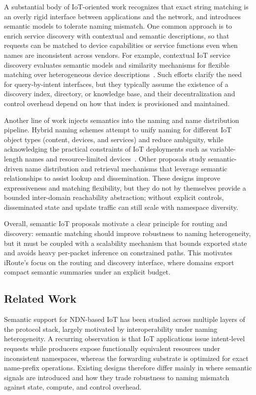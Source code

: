 \documentclass[journal]{IEEEtran}
\begin{document}
A substantial body of IoT-oriented work recognizes that exact string matching is an overly rigid interface between applications and the network, and introduces semantic models to tolerate naming mismatch. One common approach is to enrich service discovery with contextual and semantic descriptions, so that requests can be matched to device capabilities or service functions even when names are inconsistent across vendors. For example, contextual IoT service discovery evaluates semantic models and similarity mechanisms for flexible matching over heterogeneous device descriptions~\cite{antunes2022context}. Such efforts clarify the need for query-by-intent interfaces, but they typically assume the existence of a discovery index, directory, or knowledge base, and their decentralization and control overhead depend on how that index is provisioned and maintained.

Another line of work injects semantics into the naming and name distribution pipeline. Hybrid naming schemes attempt to unify naming for different IoT object types (content, devices, and services) and reduce ambiguity, while acknowledging the practical constraints of IoT deployments such as variable-length names and resource-limited devices~\cite{hybrid_iot_naming}. Other proposals study semantic-driven name distribution and retrieval mechanisms that leverage semantic relationships to assist lookup and dissemination. These designs improve expressiveness and matching flexibility, but they do not by themselves provide a bounded inter-domain reachability abstraction; without explicit controls, disseminated state and update traffic can still scale with namespace diversity.

Overall, semantic IoT proposals motivate a clear principle for routing and discovery: semantic matching should improve robustness to naming heterogeneity, but it must be coupled with a scalability mechanism that bounds exported state and avoids heavy per-packet inference on constrained paths. This motivates iRoute's focus on the routing and discovery interface, where domains export compact semantic summaries under an explicit budget.

\subsection{Related Work}
\label{sec:bg_related}

Semantic support for NDN-based IoT has been studied across multiple layers of the protocol stack, largely motivated by interoperability under naming heterogeneity.
A recurring observation is that IoT applications issue intent-level requests while producers expose functionally equivalent resources under inconsistent namespaces, whereas the forwarding substrate is optimized for exact name-prefix operations.
Existing designs therefore differ mainly in where semantic signals are introduced and how they trade robustness to naming mismatch against state, compute, and control overhead.
\end{document}
